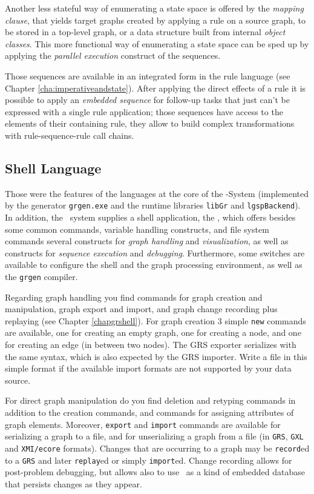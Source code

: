 Another less stateful way of enumerating a state space is offered by the \emph{mapping clause}, that yields target graphs created by applying a rule on a source graph, to be stored in a top-level graph, or a data structure built from internal \emph{object classes}.
This more functional way of enumerating a state space can be sped up by applying the \emph{parallel execution} construct of the sequences.

Those sequences are available in an integrated form in the rule language (see Chapter \ref{cha:imperativeandstate}).
After applying the direct effects of a rule it is possible to apply an \emph{embedded sequence} for follow-up tasks that just can't be expressed with a single rule application; those sequences have access to the elements of their containing rule, they allow to build complex transformations with rule-sequence-rule call chains.
		
\subsection{Shell Language}
Those were the features of the languages at the core of the \GrG-System (implemented by the generator \texttt{grgen.exe} and the runtime libraries \texttt{libGr} and \texttt{lgspBackend}).
In addition, the \GrG\ system supplies a shell application, the \GrShell,
which offers besides some common commands, variable handling constructs, and file system commands several constructs for \emph{graph handling} and \emph{visualization}, as well as constructs for \emph{sequence execution} and \emph{debugging}.
Furthermore, some switches are available to configure the shell and the graph processing environment, as well as the \texttt{grgen} compiler.

Regarding graph handling you find commands for graph creation and manipulation, graph export and import, and graph change recording plus replaying (see Chapter \ref{chapgrshell}).
For graph creation 3 simple \texttt{new} commands are available, one for creating an empty graph, one for creating a node, and one for creating an edge (in between two nodes).
The GRS exporter serializes with the same syntax, which is also expected by the GRS importer.
Write a file in this simple format if the available import formats are not supported by your data source.

For direct graph manipulation do you find deletion and retyping commands in addition to the creation commands, and commands for assigning attributes of graph elements.
Moreover, \texttt{export} and \texttt{import} commands are available for serializing a graph to a file, and for unserializing a graph from a file (in \texttt{GRS}, \texttt{GXL} and \texttt{XMI/ecore} formats). 
Changes that are occurring to a graph may be \texttt{record}ed to a \texttt{GRS} and later \texttt{replay}ed or simply \texttt{import}ed.
Change recording allows for post-problem debugging, but allows also to use \GrG\ as a kind of embedded database that persists changes as they appear. %

